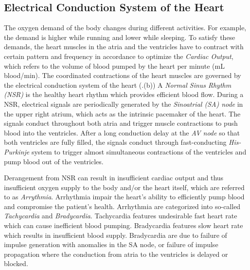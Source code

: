 \subsection{Electrical Conduction System of the Heart}
The oxygen demand of the body changes during different activities. For example, the demand is higher while running and lower while sleeping. To satisfy these demands, the heart muscles in the atria and the ventricles have to contract with certain pattern and frequency in accordance to optimize the \emph{Cardiac Output}, which refers to the volume of blood pumped by the heart per minute (mL blood/min). The coordinated contractions of the heart muscles are governed by the electrical conduction system of the heart (.(b)) A \emph{Normal Sinus Rhythm (NSR)} is the healthy heart rhythm which provides efficient blood flow. During a NSR, electrical signals are periodically generated by the \emph{Sinoatrial (SA) node} in the upper right atrium, which acts as the intrinsic pacemaker of the heart. The signals conduct throughout both atria and trigger muscle contractions to push blood into the ventricles. After a long conduction delay at the \emph{AV node} so that both ventricles are fully filled, the signals conduct through fast-conducting \emph{His-Purkinje} system to trigger almost simultaneous contractions of the ventricles and pump blood out of the ventricles. 

Derangement from NSR can result in insufficient cardiac output and thus insufficient oxygen supply to the body and/or the heart itself, which are referred to as \emph{Arrythmia}. Arrhythmia impair the heart's ability to efficiently pump blood and compromise the patient's health. 
Arrhythmia are categorized into so-called \emph{Tachycardia} and \emph{Bradycardia}. Tachycardia features undesirable fast heart rate which can cause inefficient blood pumping. Bradycardia features slow heart rate which results in insufficient blood supply. Bradycardia are due to failure of impulse generation with anomalies in the SA node, or failure of impulse propagation where the conduction from atria to the ventricles is delayed or blocked. 
